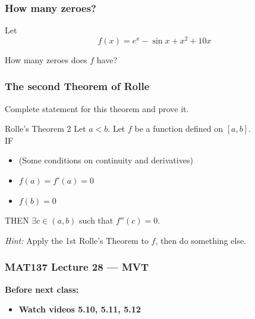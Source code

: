 \documentclass[14pt]{beamer}
\begin{document}

	\begin{frame}[t]
		\frametitle{How many zeroes?}

		Let
		\[
			f(x) = e^{x}- \sin x + x^{2}+ 10x
		\]

		How many zeroes does $f$ have?
	\end{frame}

	\begin{frame}[t]
		\frametitle{The second Theorem of Rolle}

		Complete statement for this theorem and prove it.

		\vfill

		\begin{block}{Rolle's Theorem 2}
			Let $a<b$. Let $f$ be a function defined on $[a,b]$. \\ IF
			\begin{itemize}
				\item (Some conditions on continuity and derivatives)

				\item $\displaystyle f(a) = f'(a) =0$

				\item $\displaystyle f(b)=0$
			\end{itemize}
			THEN $\displaystyle \exists c \in (a,b)$ such that $\displaystyle f''(c)=0$.
		\end{block}

		\vfill

		\emph{Hint:} Apply the 1st Rolle's Theorem to $f$, then do something else.
	\end{frame}















\begin{frame}
	\frametitle{MAT137 Lecture 28 --- MVT}

	\vfill
	{\bf Before next class:}
		\begin{itemize} \normalsize
			\item {\bf Watch videos  5.10, 5.11, 5.12}
		\end{itemize}
\end{frame}
\end{document}
